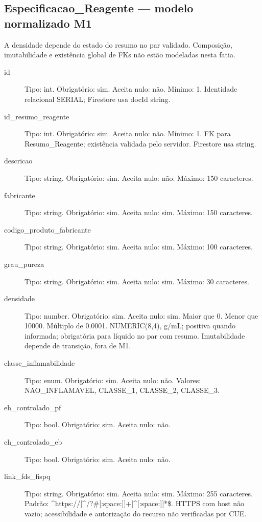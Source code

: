 \subsection*{Especificacao\_Reagente --- modelo normalizado M1}
A densidade depende do estado do resumo no par validado. Composição, imutabilidade e existência global de FKs não estão modeladas nesta fatia.
\begin{description}
\item[id] Tipo: int. Obrigatório: sim. Aceita nulo: não.
Mínimo: 1.
Identidade relacional SERIAL; Firestore usa docId string.
\item[id\_resumo\_reagente] Tipo: int. Obrigatório: sim. Aceita nulo: não.
Mínimo: 1.
FK para Resumo\_Reagente; existência validada pelo servidor. Firestore usa string.
\item[descricao] Tipo: string. Obrigatório: sim. Aceita nulo: não.
Máximo: 150 caracteres.
\item[fabricante] Tipo: string. Obrigatório: sim. Aceita nulo: sim.
Máximo: 150 caracteres.
\item[codigo\_produto\_fabricante] Tipo: string. Obrigatório: sim. Aceita nulo: sim.
Máximo: 100 caracteres.
\item[grau\_pureza] Tipo: string. Obrigatório: sim. Aceita nulo: sim.
Máximo: 30 caracteres.
\item[densidade] Tipo: number. Obrigatório: sim. Aceita nulo: sim.
Maior que 0.
Menor que 10000.
Múltiplo de 0.0001.
NUMERIC(8,4), g/mL; positiva quando informada; obrigatória para líquido no par com resumo. Imutabilidade depende de transição, fora de M1.
\item[classe\_inflamabilidade] Tipo: enum. Obrigatório: sim. Aceita nulo: não.
Valores: NAO\_INFLAMAVEL, CLASSE\_1, CLASSE\_2, CLASSE\_3.
\item[eh\_controlado\_pf] Tipo: bool. Obrigatório: sim. Aceita nulo: não.
\item[eh\_controlado\_eb] Tipo: bool. Obrigatório: sim. Aceita nulo: não.
\item[link\_fds\_fispq] Tipo: string. Obrigatório: sim. Aceita nulo: sim.
Máximo: 255 caracteres.
Padrão: \textasciicircum{}https://[\textasciicircum{}/?\#[:space:]]+[\textasciicircum{}[:space:]]*\$.
HTTPS com host não vazio; acessibilidade e autorização do recurso não verificadas por CUE.
\end{description}
